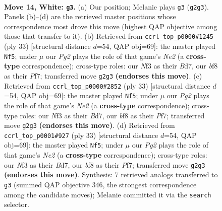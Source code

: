 \documentclass[11pt]{article}
\begin{document}
\clearpage

\begin{figure}[p]\centering
\begin{subfigure}{0.46\textwidth}\centering
\resizebox{\linewidth}{!}{%
\newchessgame
\chessboard[
  setfen={r1b1kb1r/1pp5/2n3p1/p4p1p/3P4/1PPB1N2/5PPP/R1B2RK1 w kq - 0 14},
  showmover=false,
  pgfstyle=straightmove, color=movearrow, markmove={g2-g3}
]}
\caption{}
\end{subfigure}\hfill
\begin{subfigure}{0.46\textwidth}\centering
\resizebox{\linewidth}{!}{%
\newchessgame
\chessboard[
  setfen={4k1r1/pprbnp2/4p3/3pP3/3NnP2/P7/2P3PP/1RB1KBR1 b - - 1 17},
  showmover=false,
  pgfstyle=straightmove, color=movearrow, markmove={e7-f5}
]}
\caption{}
\end{subfigure}
\\[4pt]
\begin{subfigure}{0.46\textwidth}\centering
\resizebox{\linewidth}{!}{%
\newchessgame
\chessboard[
  setfen={4k1r1/pprbnp2/4p3/3pP3/3NnP2/P7/2P3PP/1RB1KBR1 b - - 1 17},
  showmover=false,
  pgfstyle=straightmove, color=movearrow, markmove={e7-f5}
]}
\caption{}
\end{subfigure}\hfill
\begin{subfigure}{0.46\textwidth}\centering
\resizebox{\linewidth}{!}{%
\newchessgame
\chessboard[
  setfen={4k1r1/pprbnp2/4p3/3pP3/3NnP2/P7/2P3PP/1RB1KBR1 b - - 1 17},
  showmover=false,
  pgfstyle=straightmove, color=movearrow, markmove={e7-f5}
]}
\caption{}
\end{subfigure}
\caption{\textbf{Move 14, White: \texttt{g3}.} (a) Our position; Melanie plays \texttt{g3} (\texttt{g2g3}). Panels (b)--(d) are the retrieved master positions whose correspondence most drove this move (highest QAP objective among those that transfer to it). (b) Retrieved from \texttt{ccrl\_top\_p0000\#1245} (ply 33) [structural distance $d$=54, QAP obj=69]: the master played \texttt{Nf5}; under $\mu$ our \emph{Pg2} plays the role of that game's \emph{Ne2} (a \textbf{cross-type} correspondence); cross-type roles: our \emph{N}f3 as their \emph{B}d7, our \emph{b}f8 as their \emph{P}f7; transferred move \texttt{g2g3} \textbf{(endorses this move)}. (c) Retrieved from \texttt{ccrl\_top\_p0000\#2852} (ply 33) [structural distance $d$=54, QAP obj=69]: the master played \texttt{Nf5}; under $\mu$ our \emph{Pg2} plays the role of that game's \emph{Ne2} (a \textbf{cross-type} correspondence); cross-type roles: our \emph{N}f3 as their \emph{B}d7, our \emph{b}f8 as their \emph{P}f7; transferred move \texttt{g2g3} \textbf{(endorses this move)}. (d) Retrieved from \texttt{ccrl\_top\_p0001\#927} (ply 33) [structural distance $d$=54, QAP obj=69]: the master played \texttt{Nf5}; under $\mu$ our \emph{Pg2} plays the role of that game's \emph{Ne2} (a \textbf{cross-type} correspondence); cross-type roles: our \emph{N}f3 as their \emph{B}d7, our \emph{b}f8 as their \emph{P}f7; transferred move \texttt{g2g3} \textbf{(endorses this move)}. Synthesis: 7 retrieved analogs transferred to \texttt{g3} (summed QAP objective 346, the strongest correspondence among the candidate moves); Melanie committed it via the \texttt{search} selector.}
\label{fig:thought-m26}
\end{figure}
\end{document}
